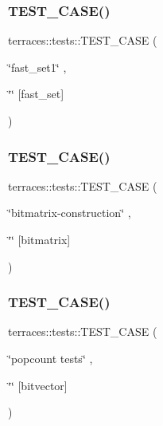 \subsubsection{\texorpdfstring{T\+E\+S\+T\+\_\+\+C\+A\+S\+E()}{TEST\_CASE()}\hspace{0.1cm}{\footnotesize\ttfamily [1/78]}}
{\footnotesize\ttfamily terraces\+::tests\+::\+T\+E\+S\+T\+\_\+\+C\+A\+SE (\begin{DoxyParamCaption}\item[{\char`\"{}fast\+\_\+set1\char`\"{}}]{,  }\item[{\char`\"{}\char`\"{}}]{\mbox{[}fast\+\_\+set\mbox{]} }\end{DoxyParamCaption})}

\mbox{\label{namespaceterraces_1_1tests_ae3c8fba3392d2b675ea99655118666ce}} 
\subsubsection{\texorpdfstring{T\+E\+S\+T\+\_\+\+C\+A\+S\+E()}{TEST\_CASE()}\hspace{0.1cm}{\footnotesize\ttfamily [2/78]}}
{\footnotesize\ttfamily terraces\+::tests\+::\+T\+E\+S\+T\+\_\+\+C\+A\+SE (\begin{DoxyParamCaption}\item[{\char`\"{}bitmatrix-\/construction\char`\"{}}]{,  }\item[{\char`\"{}\char`\"{}}]{\mbox{[}bitmatrix\mbox{]} }\end{DoxyParamCaption})}

\mbox{\label{namespaceterraces_1_1tests_a4e2937251b4a5a4f3a896ffdcb7403d0}} 
\subsubsection{\texorpdfstring{T\+E\+S\+T\+\_\+\+C\+A\+S\+E()}{TEST\_CASE()}\hspace{0.1cm}{\footnotesize\ttfamily [3/78]}}
{\footnotesize\ttfamily terraces\+::tests\+::\+T\+E\+S\+T\+\_\+\+C\+A\+SE (\begin{DoxyParamCaption}\item[{\char`\"{}popcount tests\char`\"{}}]{,  }\item[{\char`\"{}\char`\"{}}]{\mbox{[}bitvector\mbox{]} }\end{DoxyParamCaption})}

